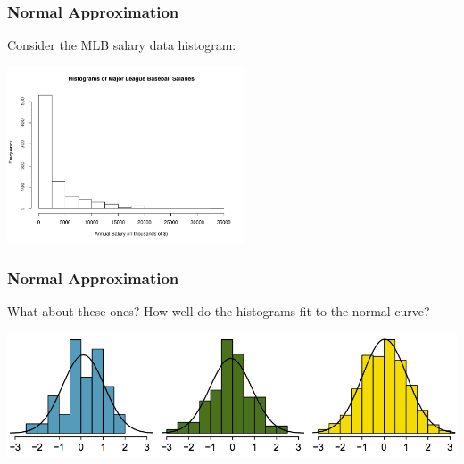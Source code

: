 \documentclass[handout]{beamer}
\begin{document}
\begin{frame}
\frametitle{Normal Approximation}

Consider the MLB salary data histogram:

\begin{center}
\includegraphics[width=7cm]{figure/MLB.pdf}
\end{center}

\end{frame}


\begin{frame}
\frametitle{Normal Approximation}

What about these ones?  How well do the histograms fit to the normal curve?

\begin{center}
\includegraphics[width=\textwidth]{figure/normal_hist.png}
\end{center}

\end{frame}
\end{document}
